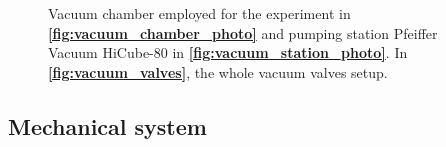 \documentclass[../../main/main.tex]{subfiles}
\begin{document}
\begin{figure}[h]
\begin{minipage}[c]{0.33\linewidth}
{            \label{fig:vacuum_station_photo}%
        }%
    \end{minipage}%
    \hfill%
    \begin{minipage}[c]{0.33\linewidth}
        \vspace{0pt}
        \centering
    \end{minipage}%
    \label{fig:vacuum_components}
    \caption{Vacuum chamber employed for the experiment in \textbf{\ref{fig:vacuum_chamber_photo}} and pumping station Pfeiffer Vacuum HiCube-80 in \textbf{\ref{fig:vacuum_station_photo}}. In \textbf{\ref{fig:vacuum_valves}}, the whole vacuum valves setup.}
\end{figure}



\subsection{Mechanical system}
\end{document}
